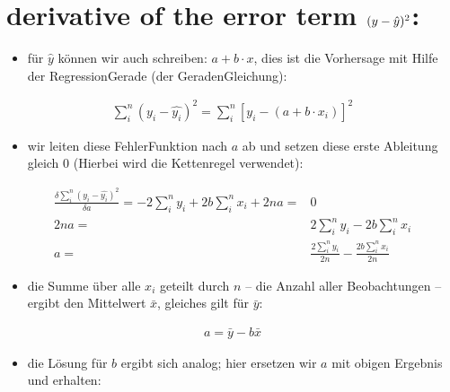 \documentclass[letterpaper,10pt,english]{jupyterBook}
\begin{document}
\section{derivative of the error term \protect\((y - \hat{y})^2\protect\):}
\label{\detokenize{Regression_Techniques:derivative-of-the-error-term-y-hat-y-2}}\begin{itemize}
\item {} 
\sphinxAtStartPar
für \(\hat{y}\) können wir auch schreiben: \(a + b\cdot x\), dies ist die Vorhersage mit Hilfe der Regression\sphinxhyphen{}Gerade (der Geraden\sphinxhyphen{}Gleichung):

\end{itemize}
\begin{equation*}
\begin{split}\sum_i^{n}(y_i - \hat{y_i})^2 = \sum_i^{n}[y_i - (a + b\cdot x_i)]^{2}\end{split}
\end{equation*}\begin{itemize}
\item {} 
\sphinxAtStartPar
wir leiten diese Fehler\sphinxhyphen{}Funktion nach \(a\) ab und setzen diese erste Ableitung gleich \(0\) (Hierbei wird die Kettenregel verwendet):

\end{itemize}
\begin{align*}
\frac{\delta \sum_i^{n}(y_i - \hat{y_i})^2}{\delta a} = -2\sum_i^{n}y_i + 2b\sum_i^{n}x_i + 2na =& 0\\
2na =& 2\sum_i^{n}y_i - 2b\sum_i^{n}x_i\\
  a =& \frac{2\sum_i^{n}y_i}{2n} - \frac{2b\sum_i^{n}x_i}{2n}
\end{align*}\begin{itemize}
\item {} 
\sphinxAtStartPar
die Summe über alle \(x_i\) geteilt durch \(n\) – die Anzahl aller Beobachtungen – ergibt den Mittelwert \(\bar{x}\), gleiches gilt für \(\bar{y}\):

\end{itemize}
\begin{equation*}
\begin{split}a = \bar{y} - b\bar{x}\end{split}
\end{equation*}\begin{itemize}
\item {} 
\sphinxAtStartPar
die Lösung für \(b\) ergibt sich analog; hier ersetzen wir \(a\) mit obigen Ergebnis und erhalten:

\end{itemize}
\end{document}
